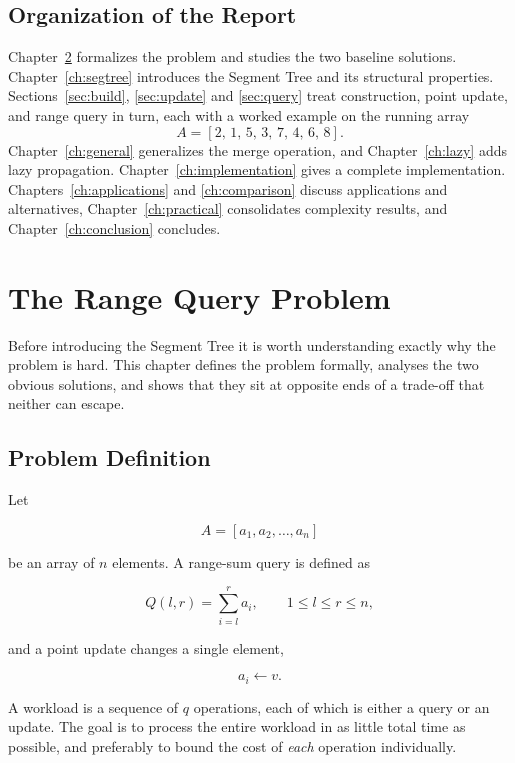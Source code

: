 \documentclass[
  11pt,
  a4paper,
  twoside=false,
  numbers=noenddot,
  headings=big,
  parskip=half,
  toc=bibliography,
  toc=listof,
  bibliography=totoc
]{scrreprt}
\newcounter{example}[chapter]
\begin{document}
\section{Organization of the Report}
Chapter~\ref{ch:problem} formalizes the problem and studies the two baseline solutions. Chapter~\ref{ch:segtree} introduces the Segment Tree and its structural properties. Sections~\ref{sec:build}, \ref{sec:update} and \ref{sec:query} treat construction, point update, and range query in turn, each with a worked example on the running array
\[
A = [2,\,1,\,5,\,3,\,7,\,4,\,6,\,8].
\]
Chapter~\ref{ch:general} generalizes the merge operation, and Chapter~\ref{ch:lazy} adds lazy propagation. Chapter~\ref{ch:implementation} gives a complete implementation. Chapters~\ref{ch:applications} and \ref{ch:comparison} discuss applications and alternatives, Chapter~\ref{ch:practical} consolidates complexity results, and Chapter~\ref{ch:conclusion} concludes.

\chapter{The Range Query Problem}
\label{ch:problem}

Before introducing the Segment Tree it is worth understanding exactly why the problem is hard. This chapter defines the problem formally, analyses the two obvious solutions, and shows that they sit at opposite ends of a trade-off that neither can escape.

\section{Problem Definition}
Let

\begin{equation}
A = [a_1, a_2, \ldots, a_n]
\end{equation}

be an array of $n$ elements. A range-sum query is defined as

\begin{equation}
Q(l,r) = \sum_{i=l}^{r} a_i, \qquad 1 \le l \le r \le n,
\end{equation}

and a point update changes a single element,

\begin{equation}
a_i \leftarrow v.
\end{equation}

A workload is a sequence of $q$ operations, each of which is either a query or an update. The goal is to process the entire workload in as little total time as possible, and preferably to bound the cost of \emph{each} operation individually.
\end{document}
